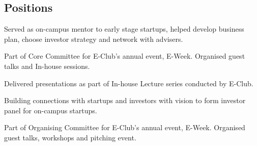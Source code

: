 \documentclass[]{deedy}
\begin{document}
\begin{minipage}[t]{0.69\textwidth}
\begin{flushleft}
\section{Positions}
%
\vspace{1.1pt}
\sectionsep
%
\vspace{1.1pt}
\begin{tightemize}
\item Served as on-campus mentor to early stage startups, helped develop business plan, choose investor strategy and network with advisers.
\item Part of Core Committee for E-Club’s annual event, E-Week. Organised guest talks and In-house sessions.
\item Delivered presentations as part of In-house Lecture series conducted by E-Club.
\end{tightemize}
\sectionsep
%
\vspace{1.1pt}
\begin{tightemize}
\item Building connections with startups and investors with vision to form investor panel for on-campus startups.
\item Part of Organising Committee for E-Club’s annual event, E-Week. Organised guest talks, workshops and pitching event.
\end{tightemize}
\sectionsep
%
\vspace{1.1pt}
\sectionsep
%
\end{flushleft}
\end{minipage}
\end{document}
